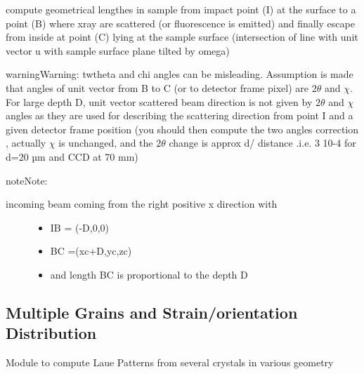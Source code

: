 \documentclass[letterpaper,10pt,english]{sphinxmanual}
\begin{document}
\begin{fulllineitems}
\label{\detokenize{Simulation_Module:LaueTools.LaueGeometry.lengthInSample}}
compute geometrical lengthes in sample from impact point (I) at the surface to a point (B)
where xray are scattered (or fluorescence is emitted) and finally escape from inside at point (C) lying at the sample surface
(intersection of line with unit vector u with sample surface plane tilted by omega)

\begin{sphinxadmonition}{warning}{Warning:}
twtheta and chi angles can be misleading.
Assumption is made that angles of unit vector from B to C (or to detector frame pixel) are
\(2 \theta\) and \(\chi\).
For large depth D, unit vector scattered beam direction is not given by \(2 \theta\) and \(\chi\) angles
as they are used for describing the scattering direction from point I and a given detector frame position
(you should then compute the two angles correction , actually \(\chi\) is unchanged, and the \(2 \theta\) change is approx
d/ distance .i.e. 3 10-4 for d=20 µm and CCD at 70 mm)
\end{sphinxadmonition}

\begin{sphinxadmonition}{note}{Note:}\begin{description}
\item[{incoming beam coming from the right positive x direction with}] \leavevmode\begin{itemize}
\item {} 
IB = (-D,0,0)

\item {} 
BC =(xc+D,yc,zc)

\item {} 
and length BC is proportional to the depth D

\end{itemize}

\end{description}
\end{sphinxadmonition}

\end{fulllineitems}



\subsection{Multiple Grains and Strain/orientation Distribution}
\label{\detokenize{Simulation_Module:module-LaueTools.multigrainsSimulator}}\label{\detokenize{Simulation_Module:multiple-grains-and-strain-orientation-distribution}}
Module to compute Laue Patterns from several crystals in various geometry
\end{document}
